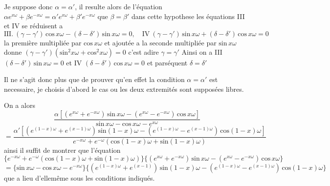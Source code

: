 \documentclass[11pt,a4paper]{article}
\begin{document}
Je suppose donc $\alpha = \alpha'$, il resulte alors de l'équation \struck{\ill{}}
$\alpha e^{x\omega} + \beta e^{-x\omega} = \alpha' e^{x\omega} + \beta' e^{-x\omega}$ \struck{\ill{}} que $\beta = \beta'$ dans cette hypothese
les équations III et IV se réduisent a
\[ \text{III.}\ (\gamma-\gamma')\,\text{cos}\,x\omega - (\delta-\delta')\,\text{sin}\,x\omega = 0, \quad \text{IV}\ (\gamma-\gamma')\,\text{sin}\,x\omega + (\delta-\delta')\,\text{cos}\,x\omega = 0 \]
la première multipliée par $\text{cos}\,x\omega$ et ajoutée a la seconde multipliée
par $\text{sin}\,x\omega$ donne $(\gamma-\gamma')(\text{sin}^2 x\omega + \text{cos}^2 x\omega) = 0$ c'est adire $\gamma = \gamma'$
Ainsi  on a III $(\delta-\delta')\,\text{sin}\,x\omega = 0$ et IV $(\delta-\delta')\,\text{cos}\,x\omega = 0$ et
parséquent $\delta = \delta'$

Il ne s'agit donc plus que de prouver qu'en effet la
condition $\alpha = \alpha'$ est necessaire, je choisis d'abord le cas
ou les deux extremités sont supposées libres.

On a alors 
\[ \frac{\alpha[(e^{x\omega}+e^{-x\omega})\,\text{sin}\,x\omega - (e^{x\omega}-e^{-x\omega})\,\text{cos}\,x\omega]}{\text{sin}\,x\omega - \text{cos}\,x\omega - e^{x\omega}} \]
\[ = \frac{\alpha'[(e^{(1-x)\omega}+e^{(x-1)\omega})\,\text{sin}(1-x)\omega - (e^{(1-x)\omega}-e^{(x-1)\omega})\,\text{cos}(1-x)\omega]}{e^{-x\omega}+e^{-\omega}(\text{cos}(1-x)\omega + \text{sin}(1-x)\omega)} \]
ainsi il suffit de  montrer que l'équation
\[ \{e^{-x\omega}+e^{-\omega}(\text{cos}(1-x)\omega+\text{sin}(1-x)\omega)\}\{(e^{x\omega}+e^{-x\omega})\,\text{sin}\,x\omega - (e^{x\omega}-e^{-x\omega})\,\text{cos}\,x\omega\} \]
\[ = \{\text{sin}\,x\omega - \text{cos}\,x\omega - e^{-x\omega}\}\{(e^{(1-x)\omega}+e^{(x-1)})\,\text{sin}(1-x)\omega - (e^{(1-x)\omega}-e^{(x-1)\omega})\,\text{cos}(1-x)\omega\} \]
que  a lieu d'ellemême sous les conditions indiqués.
\end{document}
